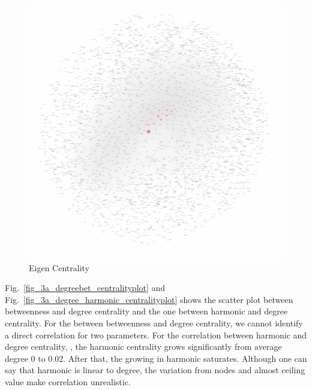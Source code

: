 \documentclass[runningheads]{llncs}
\begin{document}
\begin{figure}
\centering
\includegraphics[width=\textwidth]{3a_eigen_centrality}
\caption{Eigen Centrality} \label{fig_3a_eigen_centrality}
\end{figure}

Fig.~\ref{fig_3a_degreebet_centralityplot} and Fig.~\ref{fig_3a_degree_harmonic_centralityplot} shows the scatter plot between betweenness and degree centrality and the one between harmonic and degree centrality. For the between betweenness and degree centrality, we cannot identify a direct correlation for two parameters. For the correlation between harmonic and degree centrality, , the harmonic centrality grows significantly from average degree 0 to 0.02. After that, the growing in harmonic saturates. Although one can say that harmonic is linear to degree, the variation from nodes and almost ceiling value make correlation unrealistic.
\end{document}
